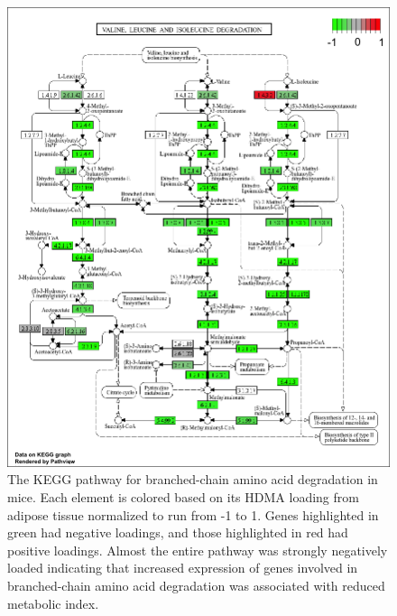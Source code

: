 \documentclass[
]{article}
\begin{document}
\begin{figure}[ht!]
\includegraphics[width=\textwidth]{Figures/Supp_Fig_Branched_Chain.png} 
\caption{The KEGG pathway for branched-chain amino acid degradation in 
mice. Each element is colored based on its HDMA loading from adipose
tissue normalized to run from -1 to 1. Genes highlighted in green had 
negative loadings, and those highlighted in red had positive loadings. 
Almost the entire pathway was strongly negatively loaded indicating 
that increased expression of genes involved in branched-chain amino acid 
degradation was associated with reduced metabolic index.
}
\label{fig:bcaa_degrataion}
\end{figure}
\end{document}
